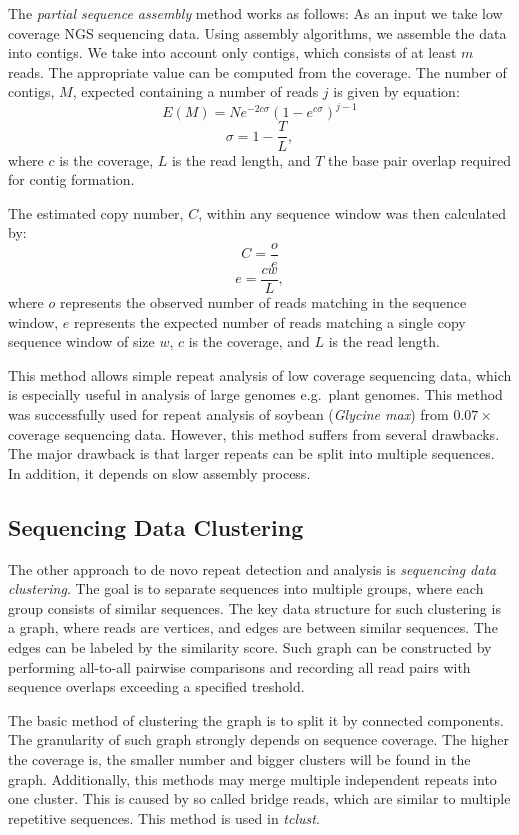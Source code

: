 The \emph{partial sequence assembly} method works as follows: As an input we take low coverage NGS sequencing data. Using assembly algorithms, we assemble the data into contigs. We take into account only contigs, which consists of at least $m$ reads. The appropriate value can be computed from the coverage. The number of contigs, $M$, expected containing a number of reads $j$ is given by equation\cite{swaminathan2007global}:
$$E(M) = Ne^{-2c\sigma}(1-e^{c\sigma})^{j-1}$$
$$\sigma = 1 - \frac{T}{L},$$
where $c$ is the coverage, $L$ is the read length, and $T$ the base pair overlap required for contig formation.

The estimated copy number, $C$, within any sequence window was then calculated by\cite{swaminathan2007global}:
$$C = \frac{o}{e}$$
$$e = \frac{cw}{L},$$
where $o$ represents the observed number of reads matching in the sequence window, $e$ represents the expected number of reads matching a single copy sequence window of size $w$, $c$ is the coverage, and $L$ is the read length.

This method allows simple repeat analysis of low coverage sequencing data, which is especially useful in analysis of large genomes e.g.\ plant genomes. This method was successfully used for repeat analysis of soybean (\textit{Glycine max}) from $0.07\times$ coverage sequencing data\cite{swaminathan2007global}.
However, this method suffers from several drawbacks. The major drawback is that larger repeats can be split into multiple sequences. In addition, it depends on slow assembly process.

\subsection{Sequencing Data Clustering}

The other approach to de novo repeat detection and analysis is \emph{sequencing data clustering}. The goal is to separate sequences into multiple groups, where each group consists of similar sequences.
The key data structure for such clustering is a graph, where reads are vertices, and edges are between similar sequences. The edges can be labeled by the similarity score. Such graph can be constructed by performing all-to-all pairwise comparisons and recording all read pairs with sequence overlaps exceeding a specified treshold\cite{pertea2003tigr, novak2010graph}. 

The basic method of clustering the graph is to split it by connected components. The granularity of such graph strongly depends on sequence coverage. The higher the coverage is, the smaller number and bigger clusters will be found in the graph. Additionally, this methods may merge multiple independent repeats into one cluster. This is caused by so called bridge reads, which are similar to multiple repetitive sequences. This method is used in \emph{tclust}\cite{pertea2003tigr}.

